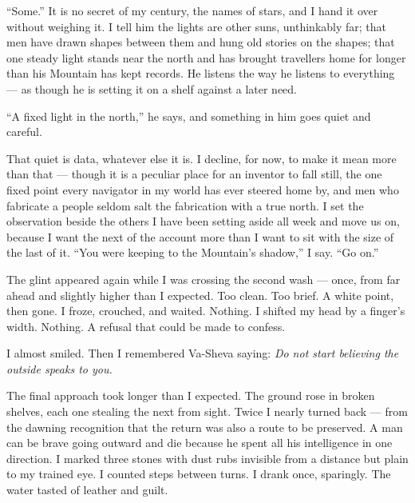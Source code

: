 ``Some.'' It is no secret of my century, the names of stars, and I hand it over without weighing it. I tell him the lights are other suns, unthinkably far; that men have drawn shapes between them and hung old stories on the shapes; that one steady light stands near the north and has brought travellers home for longer than his Mountain has kept records. He listens the way he listens to everything --- as though he is setting it on a shelf against a later need.\par

``A fixed light in the north,'' he says, and something in him goes quiet and careful.\par

That quiet is data, whatever else it is. I decline, for now, to make it mean more than that --- though it is a peculiar place for an inventor to fall still, the one fixed point every navigator in my world has ever steered home by, and men who fabricate a people seldom salt the fabrication with a true north. I set the observation beside the others I have been setting aside all week and move us on, because I want the next of the account more than I want to sit with the size of the last of it. ``You were keeping to the Mountain's shadow,'' I say. ``Go on.''\par

\ornament


The glint appeared again while I was crossing the second wash --- once, from far ahead and slightly higher than I expected. Too clean. Too brief. A white point, then gone. I froze, crouched, and waited. Nothing. I shifted my head by a finger's width. Nothing. A refusal that could be made to confess.\par

I almost smiled. Then I remembered Va-Sheva saying: \textit{Do not start believing the outside speaks to you.}\par

The final approach took longer than I expected. The ground rose in broken shelves, each one stealing the next from sight. Twice I nearly turned back --- from the dawning recognition that the return was also a route to be preserved. A man can be brave going outward and die because he spent all his intelligence in one direction. I marked three stones with dust rubs invisible from a distance but plain to my trained eye. I counted steps between turns. I drank once, sparingly. The water tasted of leather and guilt.\par

